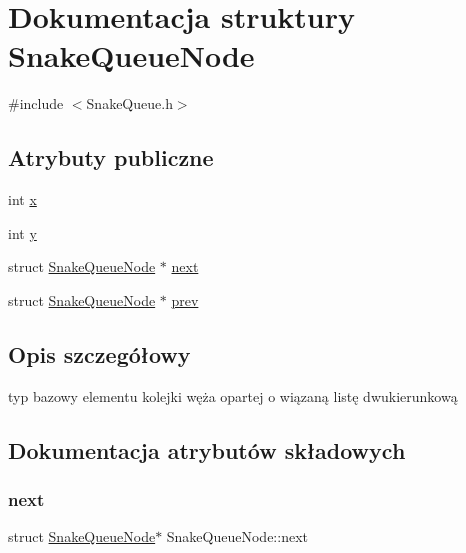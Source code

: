 \hypertarget{struct_snake_queue_node}{}\section{Dokumentacja struktury Snake\+Queue\+Node}
\label{struct_snake_queue_node}


{\ttfamily \#include $<$Snake\+Queue.\+h$>$}

\subsection*{Atrybuty publiczne}
\begin{DoxyCompactItemize}
\item 
int \mbox{\hyperlink{struct_snake_queue_node_ad1a354fa473ef2024c04198732c70da2}{x}}
\item 
int \mbox{\hyperlink{struct_snake_queue_node_a381b33b6f6e38e1e33c6c7fd4e1e40aa}{y}}
\item 
struct \mbox{\hyperlink{struct_snake_queue_node}{Snake\+Queue\+Node}} $\ast$ \mbox{\hyperlink{struct_snake_queue_node_a59b4d253712aa9845911e35f4def5b77}{next}}
\item 
struct \mbox{\hyperlink{struct_snake_queue_node}{Snake\+Queue\+Node}} $\ast$ \mbox{\hyperlink{struct_snake_queue_node_a82d23b0c0ebc4b94722733faf8f84297}{prev}}
\end{DoxyCompactItemize}


\subsection{Opis szczegółowy}
typ bazowy elementu kolejki węża opartej o wiązaną listę dwukierunkową 

\subsection{Dokumentacja atrybutów składowych}
\mbox{\label{struct_snake_queue_node_a59b4d253712aa9845911e35f4def5b77}} 
\subsubsection{\texorpdfstring{next}{next}}
{\footnotesize\ttfamily struct \mbox{\hyperlink{struct_snake_queue_node}{Snake\+Queue\+Node}}$\ast$ Snake\+Queue\+Node\+::next}

